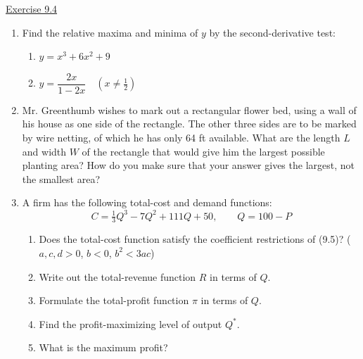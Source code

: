 \underline{Exercise 9.4}
\begin{enumerate}
\item[1.] Find the relative maxima and minima of $y$ by the second-derivative test:
\begin{enumerate}
\item[(b)] $y = x^{3} + 6x^{2} + 9$
\item[(d)] $y = \dfrac{2x}{1 - 2x} \quad \left(x \neq \tfrac{1}{2}\right)$
\end{enumerate}

\item[2.] Mr. Greenthumb wishes to mark out a rectangular flower bed, using a wall of his house as one side of the rectangle. The other three sides are to be marked by wire netting, of which he has only 64 ft available. What are the length $L$ and width $W$ of the rectangle that would give him the largest possible planting area? How do you make sure that your answer gives the largest, not the smallest area?

\item[3.] A firm has the following total-cost and demand functions:
\[ C = \tfrac{1}{3}Q^{3} - 7Q^{2} + 111Q + 50, \qquad Q = 100 - P \]
\begin{enumerate}
\item[(a)] Does the total-cost function satisfy the coefficient restrictions of (9.5)? ($a, c, d > 0$, $b < 0$, $b^{2} < 3ac$)
\item[(b)] Write out the total-revenue function $R$ in terms of $Q$.
\item[(c)] Formulate the total-profit function $\pi$ in terms of $Q$.
\item[(d)] Find the profit-maximizing level of output $Q^{*}$.
\item[(e)] What is the maximum profit?
\end{enumerate}

\end{enumerate}
